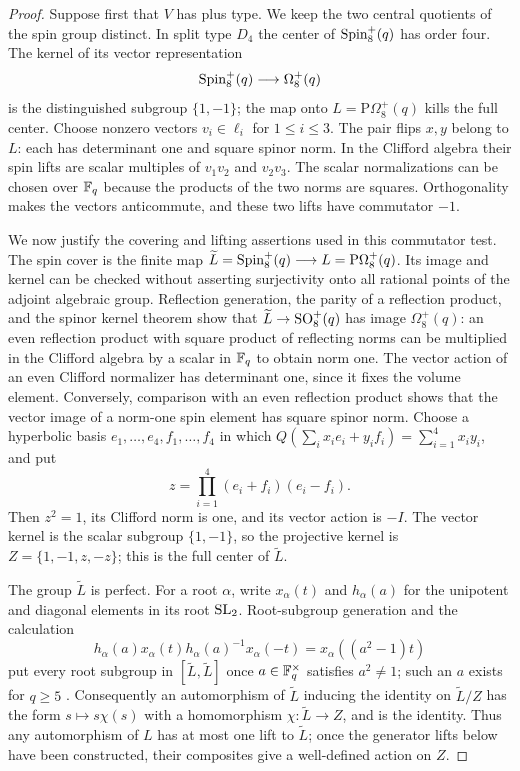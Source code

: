 \begin{proof}
Suppose first that $V$ has plus type. We keep the two central quotients
of the spin group distinct. In split type $D_4$ the center of
$\operatorname{Spin}_8^+(q)$ has order four.  The kernel of its vector representation
\[
 \operatorname{Spin}_8^+(q)\longrightarrow\Omega_8^+(q)
\]
is the distinguished subgroup $\{1,-1\}$; the map onto
$L=\mathrm P\Omega_8^+(q)$ kills the full center.  Choose nonzero
vectors $v_i\in\ell_i$ for $1\leq i\leq3$. The pair flips $x,y$ belong
to $L$: each has determinant one and square spinor norm. In the Clifford
algebra their spin lifts are scalar multiples of $v_1v_2$ and $v_2v_3$. The scalar
normalizations can be chosen over $\mathbb F_q$ because the products of the
two norms are squares.  Orthogonality makes the vectors anticommute,
and these two lifts have commutator $-1$.

We now justify the covering and lifting assertions used in this
commutator test. The spin cover is the finite map
$\widetilde L=\operatorname{Spin}_8^+(q)\longrightarrow L=\mathrm P\Omega_8^+(q)$.
Its image and kernel can be checked without asserting surjectivity onto
all rational points of the adjoint algebraic group.  Reflection generation,
the parity of a reflection product, and the spinor kernel theorem
\cite[Theorems 11.39, 11.44, 11.50--11.51]{Taylor1992} show that
$\widetilde L\to \operatorname{SO}_8^+(q)$ has image $\Omega_8^+(q)$: an even reflection
product with square product of reflecting norms can be multiplied in the
Clifford algebra by a scalar in $\mathbb F_q$ to obtain norm one.
The vector action of an even Clifford normalizer has determinant one,
since it fixes the volume element.  Conversely, comparison with an even
reflection product shows that the vector image of a norm-one spin element
has square spinor norm.
Choose a hyperbolic basis $e_1,\ldots,e_4,f_1,\ldots,f_4$
in which $Q(\sum_i x_i e_i+y_i f_i)=\sum_{i=1}^4x_i y_i$, and put
\[
 z=\prod_{i=1}^4(e_i+f_i)(e_i-f_i).
\]
Then $z^2=1$, its Clifford norm is one, and its vector action is $-I$.
The vector kernel is the scalar subgroup $\{1,-1\}$, so the projective
kernel is $Z=\{1,-1,z,-z\}$; this is the full center of $\widetilde L$.

The group $\widetilde L$ is perfect. For a root $\alpha$, write
$x_\alpha(t)$ and $h_\alpha(a)$ for the unipotent and diagonal
elements in its root $\operatorname{SL}_2$. Root-subgroup generation and the calculation
\[
 h_\alpha(a)x_\alpha(t)h_\alpha(a)^{-1}x_\alpha(-t)
   =x_\alpha((a^2-1)t)
\]
put every root subgroup in $[\widetilde L,\widetilde L]$ once $a\in\mathbb F_q^\times$
satisfies $a^2\ne1$; such an $a$ exists for $q\ge5$
\cite[\S2, p.~416]{CEKT2013}.
Consequently an automorphism of $\widetilde L$ inducing the identity on $\widetilde L/Z$
has the form $s\mapsto s\chi(s)$ with a homomorphism $\chi:\widetilde L\to Z$,
and is the identity.  Thus any automorphism of $L$ has at most one lift
to $\widetilde L$; once the generator lifts below have been constructed, their
composites give a well-defined action on $Z$.


\end{proof}
